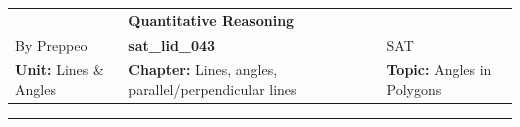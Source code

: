 \documentclass[11pt,paper=a4,answers]{exam}
\begin{document}
\begin{center}
    \centering
    \renewcommand{\arraystretch}{1.5}
    \begin{tabularx}{\textwidth}{YYY}
    & \normalsize\bf{{\Large{{Quantitative Reasoning}}}} & \\
    By Preppeo & \normalsize\bf{{sat\_lid\_043}} & SAT\\
    \normalsize{{\textbf{{Unit:}} Lines \& Angles}} & \normalsize{{\textbf{{Chapter:}} Lines, angles, parallel/perpendicular lines}} & \normalsize{{\textbf{{Topic:}} Angles in Polygons}} \\
    \end{tabularx}
\end{center}
\par\noindent\rule{\textwidth}{1pt}
\end{document}
